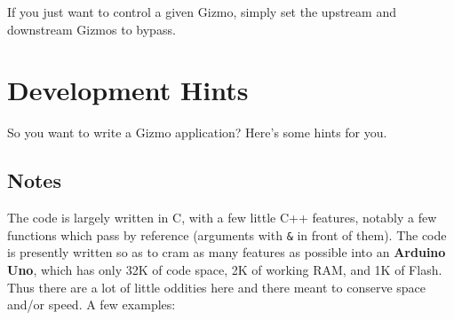 \documentclass{article}
\begin{document}
If you just want to control a given Gizmo, simply set the upstream and downstream Gizmos to bypass.  



\section{Development Hints}

So you want to write a Gizmo application?  Here's some hints for you.

\subsection{Notes}

The code is largely written in C, with a few little C++ features, notably
a few functions which pass by reference (arguments with \texttt{\&} in front of them).  The
code is presently written so as to cram as many features as possible into an
{\bf Arduino Uno}, which has only 32K of code space, 2K of working RAM, and 1K of Flash.  
Thus there are a lot of little oddities here and there meant to conserve space and/or
speed.  A few examples:
\end{document}
